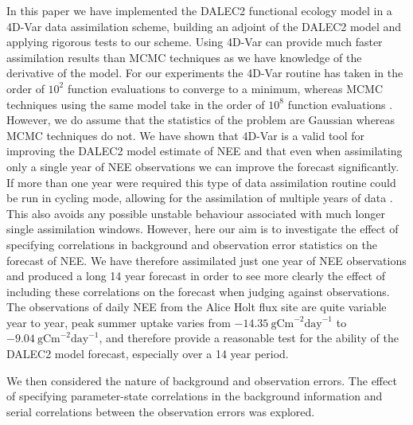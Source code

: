 \documentclass[review]{elsarticle}
\begin{document}
In this paper we have implemented the DALEC2 functional ecology model in a 4D-Var data assimilation scheme, building an adjoint of the DALEC2 model and applying rigorous tests to our scheme. Using 4D-Var can provide much faster assimilation results than MCMC techniques as we have knowledge of the derivative of the model. For our experiments the 4D-Var routine has taken in the order of $10^{2}$ function evaluations to converge to a minimum, whereas MCMC techniques using the same model take in the order of $10^{8}$ function evaluations \citep{Bloom2015}. However, we do assume that the statistics of the problem are Gaussian whereas MCMC techniques do not. We have shown that 4D-Var is a valid tool for improving the DALEC2 model estimate of NEE and that even when assimilating only a single year of NEE observations we can improve the forecast significantly. If more than one year were required this type of data assimilation routine could be run in cycling mode, allowing for the assimilation of multiple years of data \citep{moodycycled4dvar}. This also avoids any possible unstable behaviour associated with much longer single assimilation windows. However, here our aim is to investigate the effect of specifying correlations in background and observation error statistics on the forecast of NEE. We have therefore assimilated just one year of NEE observations and produced a long 14 year forecast in order to see more clearly the effect of including these correlations on the forecast when judging against observations. The observations of daily NEE from the Alice Holt flux site are quite variable year to year, peak summer uptake varies from $-14.35~\text{gCm}^{-2}\text{day}^{-1}$ to $-9.04~\text{gCm}^{-2}\text{day}^{-1}$, and therefore provide a reasonable test for the ability of the DALEC2 model forecast, especially over a 14 year period.  

We then considered the nature of background and observation errors. The effect of specifying parameter-state correlations in the background information and serial correlations between the observation errors was explored.
\end{document}
